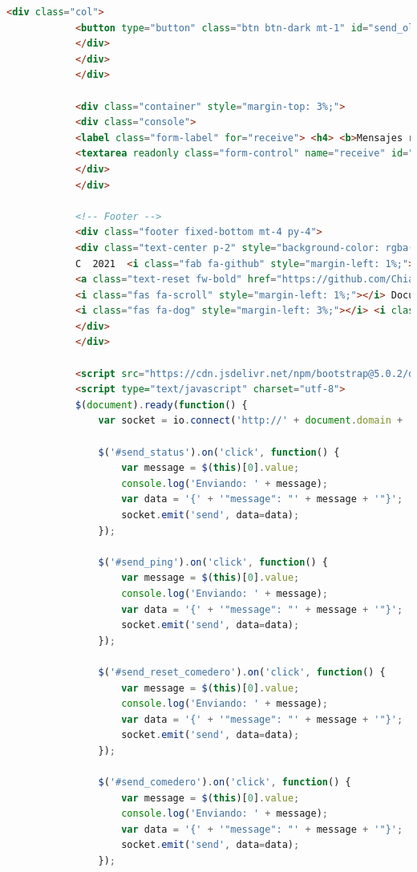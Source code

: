 \documentclass[12pt]{article}
\begin{document}
\begin{lstlisting}[language=html]
			<div class="col">
			<button type="button" class="btn btn-dark mt-1" id="send_oled" value="update_oled"><i class="fas fa-desktop"></i> Actualizar pantalla</button>
			</div>
			</div>
			</div>
			
			<div class="container" style="margin-top: 3%;">
			<div class="console">
			<label class="form-label" for="receive"> <h4> <b>Mensajes recibidos:</b> </h4>  </label>
			<textarea readonly class="form-control" name="receive" id="receive" rows="8" style="width: 100%; height: auto;"></textarea>
			</div>
			</div>
			
			<!-- Footer -->
			<div class="footer fixed-bottom mt-4 py-4">
			<div class="text-center p-2" style="background-color: rgba(0, 0, 0, 0.05); margin-bottom: -1%;">
			C  2021  <i class="fab fa-github" style="margin-left: 1%;"></i> Github:
			<a class="text-reset fw-bold" href="https://github.com/ChiaFranfer">ChiaFranfer</a> 
			<i class="fas fa-scroll" style="margin-left: 1%;"></i> Documentacion: <a class="text-reset fw-bold" href="{{url_for('doc')}}"> Ir a documentacion</a>
			<i class="fas fa-dog" style="margin-left: 3%;"></i> <i class="fas fa-cat"></i> <i class="fas fa-heart"></i>
			</div>
			</div>
			
			<script src="https://cdn.jsdelivr.net/npm/bootstrap@5.0.2/dist/js/bootstrap.bundle.min.js" integrity="sha384-MrcW6ZMFYlzcLA8Nl+NtUVF0sA7MsXsP1UyJoMp4YLEuNSfAP+JcXn/tWtIaxVXM" crossorigin="anonymous"></script>
			<script type="text/javascript" charset="utf-8">
			$(document).ready(function() {
				var socket = io.connect('http://' + document.domain + ':' + location.port);
				
				$('#send_status').on('click', function() {
					var message = $(this)[0].value;
					console.log('Enviando: ' + message);
					var data = '{' + '"message": "' + message + '"}';
					socket.emit('send', data=data);
				});
				
				$('#send_ping').on('click', function() {
					var message = $(this)[0].value;
					console.log('Enviando: ' + message);
					var data = '{' + '"message": "' + message + '"}';
					socket.emit('send', data=data);
				});
				
				$('#send_reset_comedero').on('click', function() {
					var message = $(this)[0].value;
					console.log('Enviando: ' + message);
					var data = '{' + '"message": "' + message + '"}';
					socket.emit('send', data=data);
				});
				
				$('#send_comedero').on('click', function() {
					var message = $(this)[0].value;
					console.log('Enviando: ' + message);
					var data = '{' + '"message": "' + message + '"}';
					socket.emit('send', data=data);
				});
				

\end{lstlisting}
\end{document}

